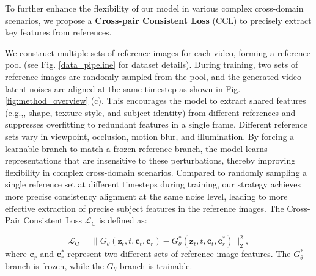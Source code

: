 \documentclass{llmxive}
\providecommand{\eg}{e.g.,\xspace}
\begin{document}
To further enhance the flexibility of our model in various complex cross-domain scenarios, we propose a \textbf{Cross-pair Consistent Loss} (CCL) to precisely extract key features from references.

We construct multiple sets of reference images for each video, forming a reference pool (see Fig. \ref{data_pipeline} for dataset details). During training, two sets of reference images are randomly sampled from the pool, and the generated video latent noises are aligned at the same timestep as shown in Fig. \ref{fig:method_overview} (c). This encourages the model to extract shared features (\eg, shape, texture style, and subject identity) from different references and suppresses overfitting to redundant features in a single frame. Different reference sets vary in viewpoint, occlusion, motion blur, and illumination. By forcing a learnable branch to match a frozen reference branch, the model learns representations that are insensitive to these perturbations, thereby improving flexibility in complex cross-domain scenarios. Compared to randomly sampling a single reference set at different timesteps during training, our strategy achieves more precise consistency alignment at the same noise level, leading to more effective extraction of precise subject features in the reference images. The Cross-Pair Consistent Loss $\mathcal{L}_{\mathrm{C}}$ is defined as:

\begin{equation}
\mathcal{L}_{\mathrm{C}}=\|{G}_\theta(\boldsymbol{z}_t,t,\boldsymbol{c}_t,\boldsymbol{c}_r)-{G}^*_\theta(\boldsymbol{z}_t,t,\boldsymbol{c}_t,\boldsymbol{c}^*_r)\|_2^2,
\label{eq:loss_2}
\end{equation}
where $\boldsymbol{c}_r$ and $\boldsymbol{c}^*_r$ represent two different sets of reference image features. The ${G}^*_\theta$ branch is frozen, while the ${G}_\theta$ branch is trainable.
\end{document}
